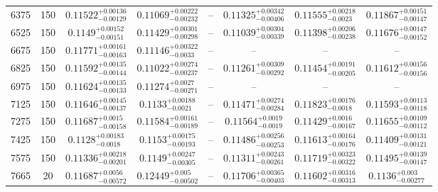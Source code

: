 \documentclass[twocolumn]{aastex63}
\begin{document}
\begin{table*}[ht!]
\begin{tabular}{cccccccc}
6375     &      150 &  $0.11522^{+0.00136}_{-0.00129}$ &  $0.11069^{+0.00222}_{-0.00232}$ &                              -- &  $0.11325^{+0.00342}_{-0.00406}$ &   $0.11555^{+0.00218}_{-0.0023}$ &  $0.11867^{+0.00151}_{-0.00147}$ \\
6525     &      150 &   $0.1149^{+0.00152}_{-0.00151}$ &  $0.11429^{+0.00301}_{-0.00298}$ &                              -- &  $0.11039^{+0.00304}_{-0.00339}$ &  $0.11398^{+0.00206}_{-0.00238}$ &  $0.11676^{+0.00147}_{-0.00152}$ \\
6675     &      150 &  $0.11771^{+0.00161}_{-0.00163}$ &   $0.11146^{+0.00322}_{-0.0033}$ &                              -- &                              -- &                              -- &                              -- \\
6825     &      150 &  $0.11592^{+0.00135}_{-0.00144}$ &  $0.11022^{+0.00274}_{-0.00237}$ &                              -- &  $0.11261^{+0.00309}_{-0.00292}$ &  $0.11454^{+0.00191}_{-0.00205}$ &  $0.11612^{+0.00156}_{-0.00156}$ \\
6975     &      150 &  $0.11624^{+0.00135}_{-0.00133}$ &   $0.11274^{+0.0027}_{-0.00271}$ &                              -- &                              -- &                              -- &                              -- \\
7125     &      150 &  $0.11646^{+0.00145}_{-0.00137}$ &    $0.1133^{+0.00188}_{-0.0021}$ &                              -- &  $0.11471^{+0.00274}_{-0.00284}$ &   $0.11823^{+0.00176}_{-0.0018}$ &  $0.11593^{+0.00113}_{-0.00118}$ \\
7275     &      150 &   $0.11687^{+0.0015}_{-0.00158}$ &  $0.11584^{+0.00161}_{-0.00189}$ &                              -- &    $0.11564^{+0.0019}_{-0.0019}$ &   $0.11429^{+0.0016}_{-0.00167}$ &  $0.11655^{+0.00109}_{-0.00112}$ \\
7425     &      150 &    $0.1128^{+0.00183}_{-0.0018}$ &   $0.1153^{+0.00175}_{-0.00193}$ &                              -- &  $0.11486^{+0.00256}_{-0.00253}$ &  $0.11613^{+0.00164}_{-0.00176}$ &  $0.11409^{+0.00131}_{-0.00121}$ \\
7575     &      150 &  $0.11336^{+0.00218}_{-0.00201}$ &   $0.1149^{+0.00247}_{-0.00305}$ &                              -- &  $0.11311^{+0.00243}_{-0.00261}$ &  $0.11719^{+0.00323}_{-0.00322}$ &  $0.11495^{+0.00139}_{-0.00147}$ \\
7665     &       20 &   $0.11687^{+0.0056}_{-0.00572}$ &    $0.12449^{+0.005}_{-0.00502}$ &                              -- &  $0.11706^{+0.00365}_{-0.00403}$ &  $0.11602^{+0.00316}_{-0.00313}$ &     $0.1136^{+0.003}_{-0.00277}$ \\

\end{tabular}
\end{table*}
\end{document}

